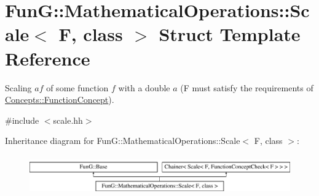 \hypertarget{structFunG_1_1MathematicalOperations_1_1Scale}{\section{Fun\-G\-:\-:Mathematical\-Operations\-:\-:Scale$<$ F, class $>$ Struct Template Reference}
\label{structFunG_1_1MathematicalOperations_1_1Scale}
}


Scaling $ af $ of some function $ f $ with a double $ a $ (F must satisfy the requirements of \hyperlink{structFunG_1_1Concepts_1_1FunctionConcept}{Concepts\-::\-Function\-Concept}).  




{\ttfamily \#include $<$scale.\-hh$>$}

Inheritance diagram for Fun\-G\-:\-:Mathematical\-Operations\-:\-:Scale$<$ F, class $>$\-:\begin{figure}[H]
\begin{center}
\leavevmode
\includegraphics[height=1.717791cm]{structFunG_1_1MathematicalOperations_1_1Scale}
\end{center}
\end{figure}
